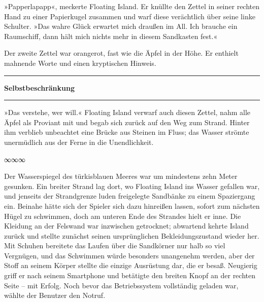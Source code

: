 »Papperlapapp«, meckerte Floating Island. Er knüllte den Zettel in seiner rechten Hand zu einer Papierkugel zusammen und warf diese verächtlich über seine linke Schulter. »Das wahre Glück erwartet mich draußen im All. Ich brauche ein Raumschiff, dann hält mich nichts mehr in diesem Sandkasten fest.«

Der zweite Zettel war orangerot, fast wie die Äpfel in der Höhe. Er enthielt mahnende Worte und einen kryptischen Hinweis.

\noindent \parbox{\textwidth}{ \vspace{3ex} \hrule \vspace{3ex}

\textbf{Selbstbeschränkung}


\vspace{3ex} \hrule \vspace{3ex} }

»Das verstehe, wer will.« Floating Island verwarf auch diesen Zettel, nahm alle Äpfel als Proviant mit und begab sich zurück auf den Weg zum Strand. Hinter ihm verblieb unbeachtet eine Brücke aus Steinen im Fluss; das Wasser strömte unermüdlich aus der Ferne in die Unendlichkeit.

\begin{center}
∞∞∞
\end{center}

Der Wasserspiegel des türkisblauen Meeres war um mindestens zehn Meter gesunken. Ein breiter Strand lag dort, wo Floating Island ins Wasser gefallen war, und jenseits der Strandgrenze luden freigelegte Sandbänke zu einem Spaziergang ein. Beinahe hätte sich der Spieler sich dazu hinreißen lassen, sofort zum nächsten Hügel zu schwimmen, doch am unteren Ende des Strandes hielt er inne. Die Kleidung an der Felswand war inzwischen getrocknet; abwartend kehrte Island zurück und stellte zunächst seinen ursprünglichen Bekleidungszustand wieder her. Mit Schuhen bereitete das Laufen über die Sandkörner nur halb so viel Vergnügen, und das Schwimmen würde besonders unangenehm werden, aber der Stoff an seinem Körper stellte die einzige Ausrüstung dar, die er besaß. Neugierig griff er nach seinem Smartphone und betätigte den breiten Knopf an der rechten Seite – mit Erfolg. Noch bevor das Betriebssystem vollständig geladen war, wählte der Benutzer den Notruf.

